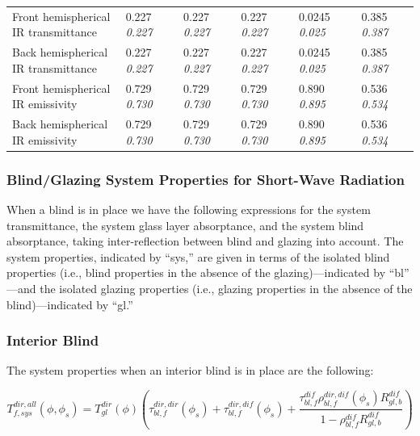 \begin{longtable}[c]{p{1.0in}p{0.4in}p{0.4in}p{0.4in}p{0.4in}p{0.4in}p{0.4in}p{0.4in}p{0.4in}p{0.4in}p{0.4in}}
Front hemispherical IR transmittance & 0.227 \quad \quad \textit{0.227} &  & 0.227 \quad \quad \textit{0.227} &  & 0.227 \quad \quad \textit{0.227} &  & 0.0245 \quad \quad \textit{0.025} &  & 0.385 \quad \quad \textit{0.387} &  \tabularnewline
Back hemispherical IR transmittance & 0.227 \quad \quad \textit{0.227} &  & 0.227 \quad \quad \textit{0.227} &  & 0.227 \quad \quad \textit{0.227} &  & 0.0245 \quad \quad \textit{0.025} &  & 0.385 \quad \quad \textit{0.387} &  \tabularnewline
Front hemispherical IR emissivity & 0.729 \quad \quad \textit{0.730} &  & 0.729 \quad \quad \textit{0.730} &  & 0.729 \quad \quad \textit{0.730} &  & 0.890 \quad \quad \textit{0.895} &  & 0.536 \quad \quad \textit{0.534} &  \tabularnewline
Back hemispherical IR emissivity & 0.729 \quad \quad \textit{0.730} &  & 0.729 \quad \quad \textit{0.730} &  & 0.729 \quad \quad \textit{0.730} &  & 0.890 \quad \quad \textit{0.895} &  & 0.536 \quad \quad \textit{0.534} &  \tabularnewline
\bottomrule
\end{longtable}

\subsubsection{Blind/Glazing System Properties for Short-Wave Radiation}\label{blindglazing-system-properties-for-short-wave-radiation}

When a blind is in place we have the following expressions for the system transmittance, the system glass layer absorptance, and the system blind absorptance, taking inter-reflection between blind and glazing into account. The system properties, indicated by ``sys,'' are given in terms of the isolated blind properties (i.e., blind properties in the absence of the glazing)---indicated by ``bl'' ---and the isolated glazing properties (i.e., glazing properties in the absence of the blind)---indicated by ``gl.''

\subsubsection{Interior Blind}\label{interior-blind}

The system properties when an interior blind is in place are the following:

\begin{equation}
T_{f,sys}^{dir,all}(\phi ,{\phi_s}) = T_{gl}^{dir}(\phi )\left( {\tau_{bl,f}^{dir,dir}({\phi_s}) + \tau_{bl,f}^{dir,dif}({\phi_s}) + \frac{{\tau_{bl,f}^{dif}\rho_{bl,f}^{dir,dif}({\phi_s})R_{gl,b}^{dif}}}{{1 - \rho_{bl,f}^{dif}R_{gl,b}^{dif}}}} \right)
\end{equation}

